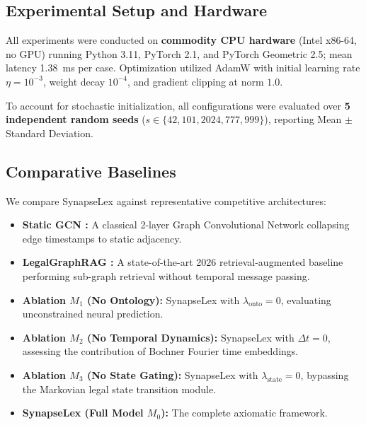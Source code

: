 \documentclass[11pt,a4paper]{article}
\begin{document}
\subsection{Experimental Setup and Hardware}
\label{sec:setup}
All experiments were conducted on \textbf{commodity CPU hardware} (Intel x86-64, no GPU) running Python 3.11, PyTorch 2.1, and PyTorch Geometric 2.5; mean latency 1.38~ms per case. Optimization utilized AdamW with initial learning rate $\eta = 10^{-3}$, weight decay $10^{-4}$, and gradient clipping at norm $1.0$.

To account for stochastic initialization, all configurations were evaluated over \textbf{5 independent random seeds} ($s \in \{42, 101, 2024, 777, 999\}$), reporting Mean $\pm$ Standard Deviation.

\subsection{Comparative Baselines}
We compare SynapseLex against representative competitive architectures:
\begin{itemize}[leftmargin=*]
    \item \textbf{Static GCN \citep{kipf2017semi}:} A classical 2-layer Graph Convolutional Network collapsing edge timestamps to static adjacency.
    \item \textbf{LegalGraphRAG \citep{chen2026legalgraphrag}:} A state-of-the-art 2026 retrieval-augmented baseline performing sub-graph retrieval without temporal message passing.
    \item \textbf{Ablation $M_1$ (No Ontology):} SynapseLex with $\lambda_{\text{onto}} = 0$, evaluating unconstrained neural prediction.
    \item \textbf{Ablation $M_2$ (No Temporal Dynamics):} SynapseLex with $\Delta t = 0$, assessing the contribution of Bochner Fourier time embeddings.
    \item \textbf{Ablation $M_3$ (No State Gating):} SynapseLex with $\lambda_{\text{state}} = 0$, bypassing the Markovian legal state transition module.
    \item \textbf{SynapseLex (Full Model $M_0$):} The complete axiomatic framework.
\end{itemize}
\end{document}
